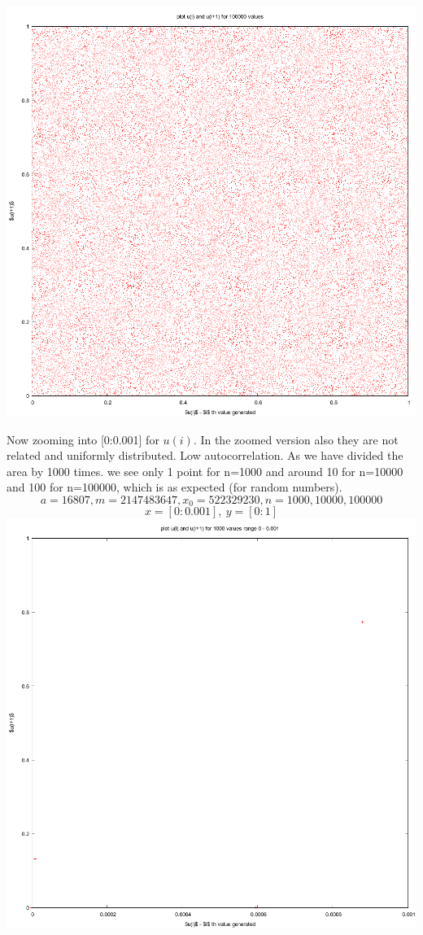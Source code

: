 \documentclass{article}
\begin{document}
\includegraphics[scale=0.45]{"dataplot1c"}
\pagebreak

Now zooming into [0:0.001] for $u(i)$. In the zoomed version also they are not related and uniformly distributed. Low autocorrelation. As we have divided the area by 1000 times. we see only 1 point for n=1000 and around 10 for n=10000 and 100 for n=100000, which is as expected (for random numbers).
$$a = 16807, m = 2147483647, x_0 = 522329230, n = 1000,10000,100000$$
$$x = [0:0.001],\ y = [0:1]$$
\includegraphics[scale=0.45]{"dataplot1d"}
\pagebreak
\end{document}
